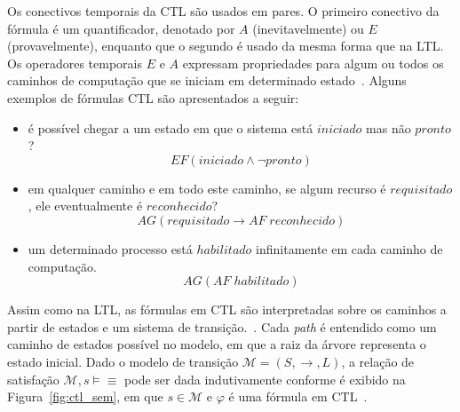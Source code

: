 Os conectivos temporais da CTL são usados em pares. O primeiro conectivo da fórmula é um quantificador, denotado por $A$ (inevitavelmente) ou $E$ (provavelmente), enquanto que o segundo é usado da mesma forma que na LTL. Os operadores temporais $E$ e $A$ expressam propriedades para algum ou todos os caminhos de computação que se iniciam em
determinado estado~\cite{katoen1999concepts}. Alguns exemplos de fórmulas CTL são apresentados a seguir: 
\begin{itemize}
	\item é possível chegar a um estado em que o sistema está $iniciado$ mas não $pronto$? 
	\begin{equation}
	EF(iniciado \wedge \neg pronto)
	\end{equation}
	\item em qualquer caminho e em todo este caminho, se algum recurso é $requisitado$, ele eventualmente é $reconhecido$? 
	\begin{equation}
	AG(requisitado \to AF\;reconhecido)
	\end{equation}
	\item um determinado processo está $habilitado$ infinitamente em cada caminho de computação. 
	\begin{equation}
	AG(AF\;habilitado)
	\end{equation}
\end{itemize}

Assim como na LTL, as fórmulas em CTL são interpretadas sobre os caminhos a partir de estados e um sistema de transição.~\cite{katoen1999concepts}. Cada \textit{path} é entendido como um caminho de estados possível no modelo, em que a raiz da árvore representa o estado inicial. Dado o modelo de transição $\mathcal{M} = (S, \rightarrow, L)$, a relação de satisfação $\mathcal{M}, s \models \equiv$ pode ser dada indutivamente conforme é exibido na Figura~\ref{fig:ctl_sem}, em que $s \in \mathcal{M}$ e $\varphi$ é uma fórmula em CTL~\cite{mura2016}.

